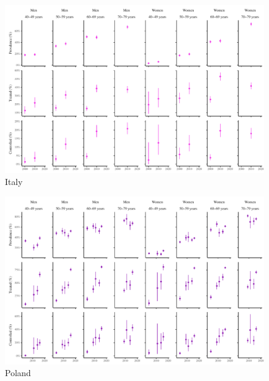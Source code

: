 \documentclass[12pt]{article}
\begin{document}
\begin{appendix}
\begin{landscape}
        \begin{figure}[H]
            \centering
            \includegraphics[width=\linewidth]{../3_figures/countries/fig_italy.pdf}
            \caption{Italy}
            \label{fig:italy}
        \end{figure}

        \begin{figure}[H]
            \centering
            \includegraphics[width=\linewidth]{../3_figures/countries/fig_poland.pdf}
            \caption{Poland}
            \label{fig:poland}
        \end{figure}


\end{landscape}
\end{appendix}
\end{document}
